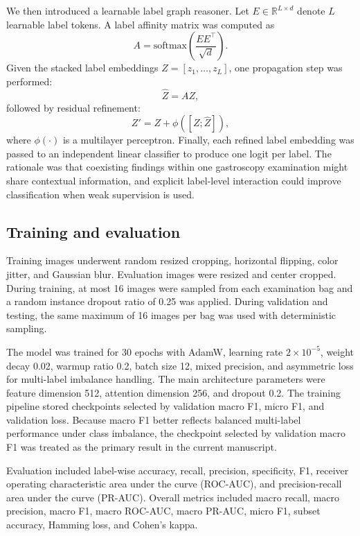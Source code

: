 \documentclass[Afour,sagev,times]{sagej}
\begin{document}
We then introduced a learnable label graph reasoner. Let $E \in \mathbb{R}^{L \times d}$ denote $L$ learnable label tokens. A label affinity matrix was computed as
\begin{equation}
A = \mathrm{softmax}\left(\frac{EE^{\top}}{\sqrt{d}}\right).
\end{equation}
Given the stacked label embeddings $Z=[z_1,\ldots,z_L]$, one propagation step was performed:
\begin{equation}
\hat{Z}=AZ,
\end{equation}
followed by residual refinement:
\begin{equation}
Z' = Z + \phi([Z;\hat{Z}]),
\end{equation}
where $\phi(\cdot)$ is a multilayer perceptron. Finally, each refined label embedding was passed to an independent linear classifier to produce one logit per label. The rationale was that coexisting findings within one gastroscopy examination might share contextual information, and explicit label-level interaction could improve classification when weak supervision is used.

\subsection{Training and evaluation}
Training images underwent random resized cropping, horizontal flipping, color jitter, and Gaussian blur. Evaluation images were resized and center cropped. During training, at most 16 images were sampled from each examination bag and a random instance dropout ratio of 0.25 was applied. During validation and testing, the same maximum of 16 images per bag was used with deterministic sampling.

The model was trained for 30 epochs with AdamW, learning rate $2\times10^{-5}$, weight decay 0.02, warmup ratio 0.2, batch size 12, mixed precision, and asymmetric loss for multi-label imbalance handling. The main architecture parameters were feature dimension 512, attention dimension 256, and dropout 0.2. The training pipeline stored checkpoints selected by validation macro F1, micro F1, and validation loss. Because macro F1 better reflects balanced multi-label performance under class imbalance, the checkpoint selected by validation macro F1 was treated as the primary result in the current manuscript.

Evaluation included label-wise accuracy, recall, precision, specificity, F1, receiver operating characteristic area under the curve (ROC-AUC), and precision-recall area under the curve (PR-AUC). Overall metrics included macro recall, macro precision, macro F1, macro ROC-AUC, macro PR-AUC, micro F1, subset accuracy, Hamming loss, and Cohen's kappa.
\end{document}
